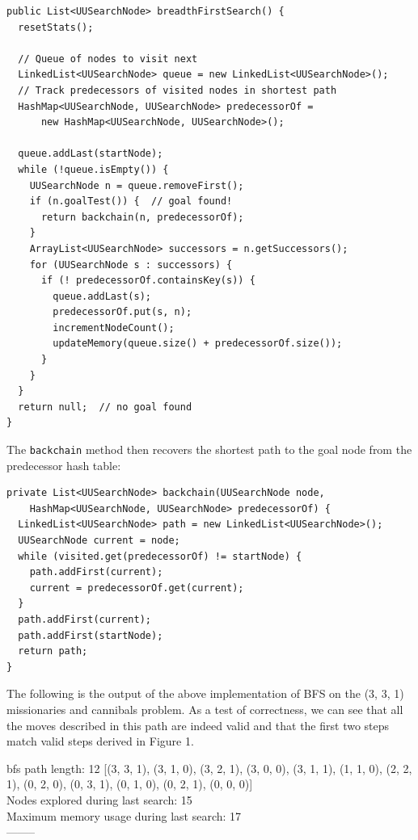 \documentclass{article}
\begin{document}
\begin{lstlisting}
public List<UUSearchNode> breadthFirstSearch() {
  resetStats();
  
  // Queue of nodes to visit next
  LinkedList<UUSearchNode> queue = new LinkedList<UUSearchNode>();
  // Track predecessors of visited nodes in shortest path
  HashMap<UUSearchNode, UUSearchNode> predecessorOf = 
      new HashMap<UUSearchNode, UUSearchNode>(); 
  
  queue.addLast(startNode);
  while (!queue.isEmpty()) {
    UUSearchNode n = queue.removeFirst();
    if (n.goalTest()) {  // goal found!
      return backchain(n, predecessorOf);
    }
    ArrayList<UUSearchNode> successors = n.getSuccessors();
    for (UUSearchNode s : successors) {
      if (! predecessorOf.containsKey(s)) {
        queue.addLast(s);
        predecessorOf.put(s, n);
        incrementNodeCount();
        updateMemory(queue.size() + predecessorOf.size());
      }
    }
  }
  return null;  // no goal found
}
\end{lstlisting}

The \verb`backchain` method then recovers the shortest path to the goal node from the predecessor hash table:

\begin{lstlisting}
private List<UUSearchNode> backchain(UUSearchNode node,
    HashMap<UUSearchNode, UUSearchNode> predecessorOf) {
  LinkedList<UUSearchNode> path = new LinkedList<UUSearchNode>();
  UUSearchNode current = node;
  while (visited.get(predecessorOf) != startNode) {
    path.addFirst(current);
    current = predecessorOf.get(current);
  }
  path.addFirst(current);
  path.addFirst(startNode);
  return path;
}
\end{lstlisting}

The following is the output of the above implementation of BFS on the (3, 3, 1) missionaries and cannibals problem. As a test of correctness, we can see that all the moves described in this path are indeed valid and that the first two steps match valid steps derived in Figure 1.

\vspace{5mm}

{\setlength{\parindent}{0cm}
bfs path length:  12 [(3, 3, 1), (3, 1, 0), (3, 2, 1), (3, 0, 0), (3, 1, 1), (1, 1, 0), (2, 2, 1), (0, 2, 0), (0, 3, 1), (0, 1, 0), (0, 2, 1), (0, 0, 0)]\\
Nodes explored during last search: 15\\
Maximum memory usage during last search: 17\\
--------}
\end{document}
